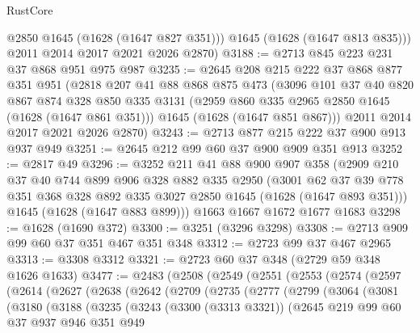 \begin{lexlean}{RustCore}
\begin{coremodule}
          @2850
          @1645
          (@1628 (@1647 @827 @351)))
        @1645
        (@1628 (@1647 @813 @835)))
      @2011
      @2014
      @2017
      @2021
      @2026
      @2870)
@3188 := @2713 @845 @223 @231 @37 @868 @951 @975 @987
@3235 := @2645
    @208
    @215
    @222
    @37
    @868
    @877
    @351
    @951
    (@2818
      @207
      @41
      @88
      @868
      @875
      @473
      (@3096
        @101
        @37
        @40
        @820
        @867
        @874
        @328
        @850
        @335
        @3131
        (@2959 @860 @335 @2965 @2850 @1645 (@1628 (@1647 @861 @351)))
        @1645
        (@1628 (@1647 @851 @867)))
      @2011
      @2014
      @2017
      @2021
      @2026
      @2870)
@3243 := @2713 @877 @215 @222 @37 @900 @913 @937 @949
@3251 := @2645 @212 @99 @60 @37 @900 @909 @351 @913
@3252 := @2817 @49
@3296 := @3252
    @211
    @41
    @88
    @900
    @907
    @358
    (@2909
      @210
      @37
      @40
      @744
      @899
      @906
      @328
      @882
      @335
      @2950
      (@3001 @62 @37 @39 @778 @351 @368 @328 @892 @335 @3027 @2850 @1645 (@1628 (@1647 @893 @351)))
      @1645
      (@1628 (@1647 @883 @899)))
    @1663
    @1667
    @1672
    @1677
    @1683
@3298 := @1628 (@1690 @372)
@3300 := @3251 (@3296 @3298)
@3308 := @2713 @909 @99 @60 @37 @351 @467 @351 @348
@3312 := @2723 @99 @37 @467 @2965
@3313 := @3308 @3312
@3321 := @2723 @60 @37 @348 (@2729 @59 @348 @1626 @1633)
@3477 := @2483
    (@2508
      (@2549
        (@2551
          (@2553
            (@2574
              (@2597
                (@2614
                  (@2627
                    (@2638
                      (@2642
                        (@2709
                          (@2735
                            (@2777
                              (@2799
                                (@3064
                                  (@3081
                                    (@3180
                                      (@3188
                                        (@3235
                                          (@3243
                                            (@3300 (@3313 @3321))
                                            (@2645
                                              @219
                                              @99
                                              @60
                                              @37
                                              @937
                                              @946
                                              @351
                                              @949

\end{coremodule}
\end{lexlean}
